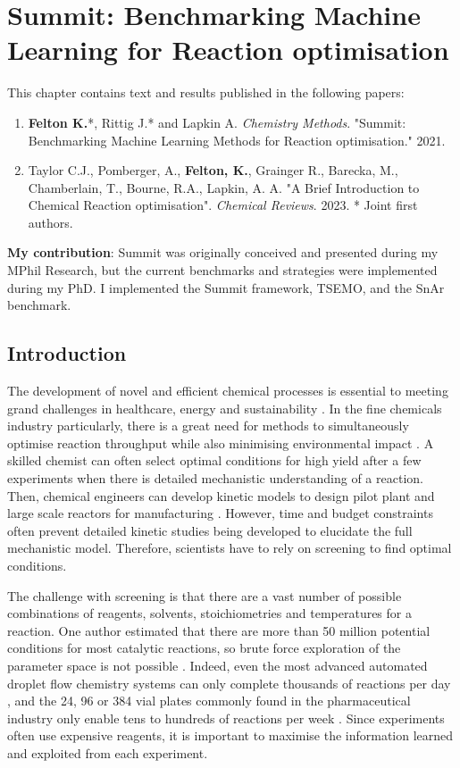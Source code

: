 \chapter{Summit: Benchmarking Machine Learning for Reaction optimisation}\label{ch:summit}

This chapter contains text and results published in the following papers:

\begin{enumerate}
\item \textbf{Felton K.}*, Rittig J.* and Lapkin A. \textit{Chemistry Methods}. "Summit: Benchmarking Machine Learning Methods for Reaction optimisation." 2021.
\item Taylor C.J., Pomberger, A., \textbf{Felton, K.}, Grainger R., Barecka, M., Chamberlain, T., Bourne, R.A., Lapkin, A. A. "A Brief Introduction to Chemical Reaction optimisation". \textit{Chemical Reviews}. 2023.
* Joint first authors.
\end{enumerate}
\textbf{My contribution}: Summit was originally conceived and presented during my MPhil Research, but the current benchmarks and strategies were implemented during my PhD. I implemented the Summit framework, TSEMO, and the SnAr benchmark.


\section{Introduction}
The development of novel and efficient chemical processes is essential to meeting grand challenges in healthcare, energy and sustainability \cite{Sheldon2018,Rogers2019}. In the fine chemicals industry particularly, there is a great need for methods to simultaneously optimise reaction throughput while also minimising environmental impact \cite{Schweidtmann2018}. A skilled chemist can often select optimal conditions for high yield after a few experiments when there is detailed mechanistic understanding of a reaction. Then, chemical engineers can develop kinetic models to design pilot plant and large scale reactors for manufacturing \cite{Roberts2008}. However, time and budget constraints often prevent detailed kinetic studies being developed to elucidate the full mechanistic model. Therefore, scientists have to rely on screening to find optimal conditions. 

The challenge with screening is that there are a vast number of possible combinations of reagents, solvents, stoichiometries and temperatures for a reaction. One author estimated that there are more than 50 million potential conditions for most catalytic reactions, so brute force exploration of the parameter space is not possible \cite{Murray2013}. Indeed, even the most advanced automated droplet flow chemistry systems can only complete thousands of reactions per day \cite{Perera2018}, and the 24, 96 or 384 vial plates commonly found in the pharmaceutical industry only enable tens to hundreds of reactions per week \cite{BuitragoSantanilla2015, Shevlin2017, Mennen2019}. Since experiments often use expensive reagents, it is important to maximise the information learned and exploited from each experiment.


